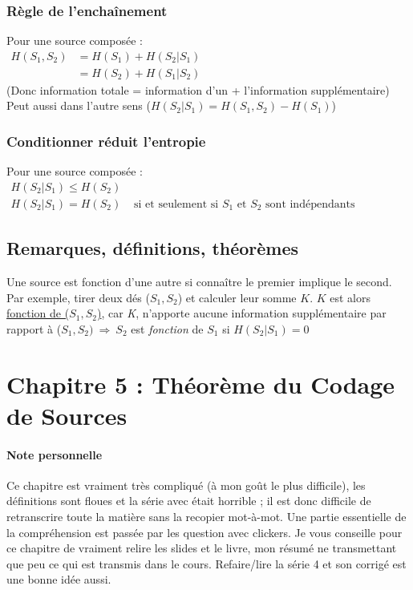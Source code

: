\documentclass[11pt,a4paper]{article}
\begin{document}
\subsubsection{Règle de l'enchaînement}
\label{enchainement}
Pour une source composée :\\
$\begin{array}{ll}
	H(S_1,S_2) 	&= H(S_1) + H(S_2|S_1)\\
				&= H(S_2) + H(S_1|S_2)
\end{array}$\\
(Donc information totale = information d'un + l'information supplémentaire)\\
Peut aussi dans l'autre sens ($H(S_2|S_1) = H(S_1,S_2) - H(S_1)$)

\subsubsection{Conditionner réduit l'entropie}
Pour une source composée :\\	
$\begin{array}{ll}
	H(S_2|S_1) \leq H(S_2) 	&\\
	H(S_2|S_1) = H(S_2) &\text{ si et seulement si $S_1$ et $S_2$ sont indépendants}
\end{array}$

\subsection{Remarques, définitions, théorèmes}
Une source est fonction d'une autre si connaître le premier implique le second. Par exemple, tirer deux dés ($S_1, S_2$) et calculer leur somme $K$. $K$ est alors \uline{fonction de ($S_1,S_2$)}, car \textit{K}, n'apporte aucune information supplémentaire par rapport à ($S_1,S_2)\ \Rightarrow\ S_2$ est \textit{fonction} de $S_1$ si $H(S_2|S_1) = 0$

\section[Théorème du Codage de Sources]{Chapitre 5 : Théorème du Codage de Sources}
\paragraph{Note personnelle}
Ce chapitre est vraiment très compliqué (à mon goût le plus difficile), les définitions sont floues et la série avec était horrible ; il est donc difficile de retranscrire toute la matière sans la recopier mot-à-mot. Une partie essentielle de la compréhension est passée par les question avec clickers. Je vous conseille pour ce chapitre de vraiment relire les slides et le livre, mon résumé ne transmettant que peu ce qui est transmis dans le cours. Refaire/lire la série 4 et son corrigé est une bonne idée aussi.
\end{document}
